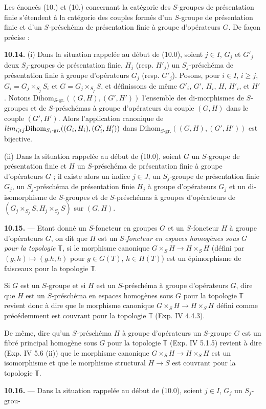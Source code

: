 \documentclass[11pt,a4paper]{article}
\begin{document}
Les énoncés (10.) et (10.) concernant la
catégorie des $S$-groupes de présentation finie s'étendent à la catégorie
des couples formés d'un $S$-groupe de présentation finie et d'un
\struck{\ill{}} $S$-préschéma de présentation finie à groupe d'opérateurs
$G$. De façon précise :

\textbf{10.14.} (i) Dans la situation rappelée au début de (10.0), soient
$j \in I$, $G_{j}$ et $G'_{j}$ deux $S_{j}$-groupes de présentation finie,
$H_{j}$ (resp. $H'_{j}$) un $S_{j}$-préschéma de présentation
finie à groupe d'opérateurs $G_{j}$ (resp. $G'_{j}$). Posons, pour
$i \in I$, $i \geqslant j$, $G_{i} = G_{j} \times_{S_{j}} S_{i}$ et
$G = G_{j} \times_{S_{j}} S$, et définissons de même $G'_{i}$, $G'$,
$H_{i}$, $H$, $H'_{i}$, et $H'$. Notons
$\mathrm{Dihom}_{S\text{-gr.}}((G, H), (G', H'))$ l'ensemble des
di-morphismes de $S$-groupes et de $S$-préschémas à groupe d'opérateurs
du couple $(G, H)$ dans le couple $(G', H')$. Alors l'application
canonique de
$\varinjlim_{i \geqslant j} \mathrm{Dihom}_{S_{i}\text{-gr.}}((G_{i}, H_{i}),
(G'_{i}, H'_{i}))$ dans $\mathrm{Dihom}_{S\text{-gr.}}((G, H), (G', H'))$
est bijective.

(ii) Dans la situation rappelée au début de (10.0), soient $G$ un
$S$-groupe \struck{\ill{}} de présentation finie et $H$ un $S$-préschéma
de présentation finie à groupe d'opérateurs $G$ ; il existe alors un
indice $j \in J$, un $S_{j}$-groupe de présentation finie $G_{j}$, un
$S_{j}$-préschéma de présentation finie $H_{j}$ à groupe d'opérateurs
$G_{j}$ et un di-isomorphisme de $S$-groupes et de $S$-préschémas à
groupes d'opérateurs de $(G_{j} \times_{S_{j}} S, H_{j} \times_{S_{j}} S)$
sur $(G, H)$.

  \textbf{10.15.} — Etant donné un
$S$-foncteur en groupes $G$ et un $S$-foncteur $H$ à groupe d'opérateurs
$G$, on dit que $H$ est un \emph{$S$-foncteur en espaces homogènes sous
$G$ pour la topologie $\mathbb{T}$}, si le morphisme canonique
$G \times_{S} H \to H \times_{S} H$ (défini par
$(g, h) \mapsto (g.h, h)$ pour $g \in G(T)$, $h \in H(T)$) est un
épimorphisme de faisceaux pour la topologie $\mathbb{T}$.

Si $G$ est un $S$-groupe et si $H$ est un $S$-préschéma à
\struck{\ill{}} groupe d'opérateurs $G$, dire que $H$ est un
$S$-préschéma en espaces homogènes sous $G$ pour la topologie
$\mathbb{T}$ revient donc à dire que le morphisme canonique
$G \times_{S} H \to H \times_{S} H$ défini comme précédemment est couvrant
pour la topologie $\mathbb{T}$ (Exp. IV 4.4.3).

De même, dire qu'un $S$-préschéma $H$ à groupe d'opérateurs un $S$-groupe
$G$ est un fibré principal homogène sous $G$ pour la topologie
$\mathbb{T}$ (Exp. IV 5.1.5) revient à dire (Exp. IV 5.6 (ii)) que le
morphisme canonique $G \times_{S} H \to H \times_{S} H$ est un
isomorphisme et que le morphisme structural $H \to S$ est couvrant pour
la topologie $\mathbb{T}$.

\textbf{10.16.} — Dans la situation rappelée au début de (10.0), soient
$j \in I$, $G_{j}$ un $S_{j}$-grou-
\end{document}
